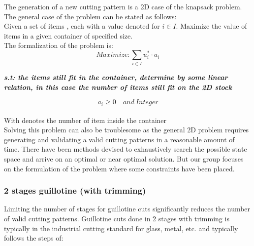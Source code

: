 \documentclass[a4paper]{article}
\begin{document}
    \noindent
    The generation of a new cutting pattern is a 2D case of the knapsack problem. The general case of the problem can be stated as follows:
    \label{sec:formulation}
    \vspace{0.2cm}\\
    Given a set of items , each with a value denoted  for $i \in I$.
    Maximize the value of items in a given container of specified size.
    \vspace{0.2cm}\\
    The formalization of the problem is:
    \[ Maximize: \sum_{i \in I} u_i^* \cdot a_i \]
    \begin{center}    
        \textit{\textbf{s.t: the items still fit in the container, determine by some linear relation, in this case the number of items still fit on the 2D stock}}
    \end{center}
    \[ a_i \geqslant 0 \quad and \  Integer \]
    \vspace{0.2cm}\\
    With  denotes the number of item  inside the container
    \vspace{0.2cm}\\
    Solving this problem can also be troublesome as the general 2D problem requires generating and validating a valid cutting patterns in a reasonable amount of time. There have been methods devised to exhaustively search the possible state space and arrive on an optimal or near optimal solution\cite{IORI2021399}. But our group focuses on the formulation of the problem where some constraints have been placed.
    
    \subsubsection{2 stages guillotine (with trimming)}
    Limiting the number of stages for guillotine cuts significantly reduces the number of valid cutting patterns. Guillotine cuts done in 2 stages with trimming is typically in the industrial cutting standard for glass, metal, etc. and typically follows the steps of:
\end{document}

